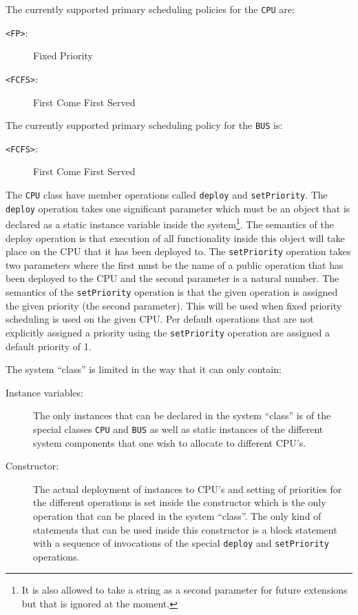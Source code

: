 \documentclass{overturerepchap}
\begin{document}
\begin{description}
The currently supported primary scheduling policies for the \texttt{CPU}
are:
\begin{description}
\item[\texttt{<FP>}:] Fixed Priority
\item[\texttt{<FCFS>}:] First Come First Served
\end{description} 

The currently supported primary scheduling policy for the \texttt{BUS}
is:
\begin{description}
\item[\texttt{<FCFS>}:] First Come First Served
\end{description} 

The \texttt{CPU} class have member operations called \texttt{deploy} and
\texttt{setPriority}. The \texttt{deploy} operation takes one
significant parameter
which must be an object that is declared as a static instance variable
inside the system\footnote{It is also allowed to take a string as a
second parameter for future extensions but that is ignored at the
moment.}. The semantics of the deploy operation is that execution
of all functionality inside this object will take place on the CPU that it
has been deployed to. The \texttt{setPriority} operation takes two 
parameters where the first must be the name of a public operation that 
has been deployed to the CPU and the second parameter is a natural number.
The semantics of the \texttt{setPriority} operation is that the given 
operation is assigned the given priority (the second parameter). This will
be used when fixed priority scheduling is used on the given CPU. Per
default operations that are not explicitly assigned a priority using
the \texttt{setPriority} operation are assigned a default priority of 1.

The system ``class'' is limited in the way that it can only contain:
\begin{description}
\item[Instance variables:] The only instances that can be declared in the 
system ``class'' is of the special classes \texttt{CPU} and \texttt{BUS} 
as well as static instances of the different system components that one 
wish to allocate to different CPU's.
\item[Constructor:] The actual deployment of instances to CPU's and setting
of priorities for the different operations is set inside the
constructor which is the only operation that can be placed in the
system ``class''. The only kind of statements that can be used inside
this constructor is a block statement with a sequence of invocations
of the special \texttt{deploy} and \texttt{setPriority} operations.
\end{description}


\end{description}
\end{document}
